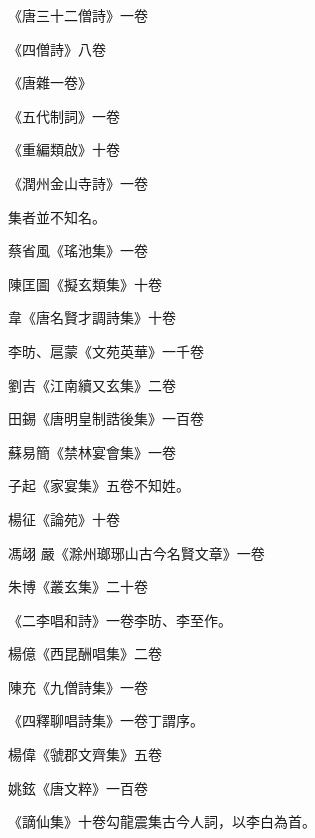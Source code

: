\begin{pinyinscope}
 《唐三十二僧詩》一卷



 《四僧詩》八卷



 《唐雜一卷》



 《五代制詞》一卷



 《重編類啟》十卷



 《潤州金山寺詩》一卷



 集者並不知名。



 蔡省風《瑤池集》一卷



 陳匡圖《擬玄類集》十卷



 韋《唐名賢才調詩集》十卷



 李昉、扈蒙《文苑英華》一千卷



 劉吉《江南續又玄集》二卷



 田錫《唐明皇制誥後集》一百卷



 蘇易簡《禁林宴會集》一卷



 子起《家宴集》五卷不知姓。



 楊征《論苑》十卷



 馮翊
 嚴《滁州瑯琊山古今名賢文章》一卷



 朱博《叢玄集》二十卷



 《二李唱和詩》一卷李昉、李至作。



 楊億《西昆酬唱集》二卷



 陳充《九僧詩集》一卷



 《四釋聊唱詩集》一卷丁謂序。



 楊偉《虢郡文齊集》五卷



 姚鉉《唐文粹》一百卷



 《謫仙集》十卷勾龍震集古今人詞，以李白為首。




\end{pinyinscope}
